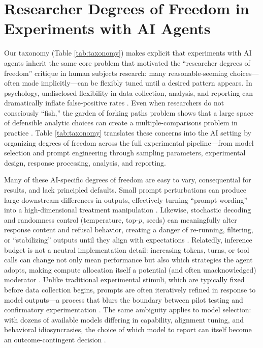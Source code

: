 \documentclass{article}
\theoremstyle{plain}
\theoremstyle{definition}
\theoremstyle{remark}
\begin{document}
\section{Researcher Degrees of Freedom in Experiments with AI Agents}\label{sec:dof}

Our taxonomy (Table \ref{tab:taxonomy}) makes explicit that experiments with AI agents inherit the same core problem that motivated the ``researcher degrees of freedom'' critique in human subjects research: many reasonable-seeming choices---often made implicitly---can be flexibly tuned until a desired pattern appears. In psychology, undisclosed flexibility in data collection, analysis, and reporting can dramatically inflate false-positive rates \citep{simmons2011falsepositive}. Even when researchers do not consciously ``fish,'' the garden of forking paths problem shows that a large space of defensible analytic choices can create a multiple-comparisons problem in practice \citep{gelman2013forkingpaths}. Table \ref{tab:taxonomy} translates these concerns into the AI setting by organizing degrees of freedom across the full experimental pipeline---from model selection and prompt engineering through sampling parameters, experimental design, response processing, analysis, and reporting.

Many of these AI-specific degrees of freedom are easy to vary, consequential for results, and lack principled defaults. Small prompt perturbations can produce large downstream differences in outputs, effectively turning ``prompt wording'' into a high-dimensional treatment manipulation \citep{salinas2024butterfly,zhao2021calibrate,liu2023pretrainpromptpredict}. Likewise, stochastic decoding and randomness control (temperature, top-$p$, seeds) can meaningfully alter response content and refusal behavior, creating a danger of re-running, filtering, or ``stabilizing'' outputs until they align with expectations \citep{larsen2025instabilitysafety}. Relatedly, inference budget is not a neutral implementation detail: increasing tokens, turns, or tool calls can change not only mean performance but also which strategies the agent adopts, making compute allocation itself a potential (and often unacknowledged) moderator \citep{snell2024testtimecompute,wei2022chainofthought,wang2023planandsolve}. Unlike traditional experimental stimuli, which are typically fixed before data collection begins, prompts are often iteratively refined in response to model outputs---a process that blurs the boundary between pilot testing and confirmatory experimentation \citep{zamfirescu-pereira2023johnny,nosek2018preregistration}. The same ambiguity applies to model selection: with dozens of available models differing in capability, alignment tuning, and behavioral idiosyncrasies, the choice of which model to report can itself become an outcome-contingent decision \citep{pineau2021reproducibility,raff2019step}.
\end{document}
